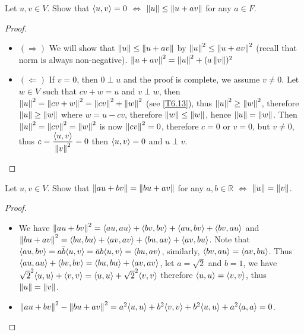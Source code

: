 \documentclass[../main.tex]{subfiles}
\begin{document}
\begin{exercise}
  Let $u, v \in V$. Show that $\langle u , v\rangle = 0$ $\iff$ $\left\Vert u \right\Vert \le \left\Vert u + av \right\Vert$ for any $a \in F$.
\end{exercise}
\begin{proof}
  ~
  \begin{itemize}
    \item $(\Rightarrow)$ We will show that $\left\Vert u \right\Vert \le \left\Vert u + av \right\Vert$ by $\left\Vert u \right\Vert^2 \le \left\Vert u + av \right\Vert^2$
          (recall that norm is always non-negative).
          $\left\Vert u + av \right\Vert^2 = \left\Vert u \right\Vert^2 + (a\left\Vert v \right\Vert)^2$
    \item $(\Leftarrow)$ If $v = 0$, then $0 \perp u$ and the proof is complete, we assume $v \neq 0$. Let $w \in V$ such that $cv + w = u$ and $v \perp w$,
          then $\left\Vert u \right\Vert^2 = \left\Vert cv + w \right\Vert^2 = \left\Vert cv \right\Vert^2 + \left\Vert w \right\Vert^2$ (see \cref{T6.13}), thus $\left\Vert u \right\Vert^2 \ge \left\Vert w \right\Vert^2$,
          therefore $\left\Vert u \right\Vert \ge \left\Vert w \right\Vert$ where $w = u - cv$, therefore $\left\Vert w \right\Vert \le \left\Vert w \right\Vert$,
          hence $\left\Vert u \right\Vert = \left\Vert w \right\Vert$.
          Then $\left\Vert u \right\Vert^2 = \left\Vert cv \right\Vert^2 = \left\Vert w \right\Vert^2$ is now $\left\Vert cv \right\Vert^2 = 0$, therefore $c = 0$ or $v = 0$, but $v \neq 0$,
          thus $c = \displaystyle \frac{\langle u , v\rangle}{\left\Vert v \right\Vert^2} = 0$ then $\langle u , v\rangle = 0$ and $u \perp v$.
  \end{itemize}
\end{proof}

\begin{exercise}
  Let $u, v \in V$. Show that $\left\Vert au + bv \right\Vert = \left\Vert bu + av \right\Vert$ for any $a, b \in \mathbb{R}$ $\iff$ $\left\Vert u \right\Vert = \left\Vert v \right\Vert$.
\end{exercise}
\begin{proof}
  ~
  \begin{itemize}
    \item We have $\left\Vert au + bv \right\Vert^2 = \langle au , au\rangle + \langle bv , bv\rangle + \langle au , bv\rangle + \langle bv , au\rangle$
          and     $\left\Vert bu + av \right\Vert^2 = \langle bu , bu\rangle + \langle av , av\rangle + \langle bu , av\rangle + \langle av , bu\rangle$.
          Note that $\langle au , bv\rangle = a\bar{b}\langle u , v\rangle = \bar{a}b\langle u , v\rangle = \langle bu , av\rangle$,
          similarly, $\langle bv , au\rangle = \langle av , bu\rangle$.
          Thus $\langle au , au\rangle + \langle bv , bv\rangle = \langle bu , bu\rangle + \langle av , av\rangle$, let $a = \sqrt{2}$ and $b = 1$,
          we have $\sqrt{2}^2\langle u , u\rangle + \langle v , v\rangle = \langle u , u\rangle + \sqrt{2}^2\langle v , v\rangle$
          therefore $\langle u , u\rangle = \langle v , v\rangle$, thus $\left\Vert u \right\Vert = \left\Vert v \right\Vert$.
    \item $\left\Vert au + bv \right\Vert^2 - \left\Vert bu + av \right\Vert^2 = a^2\langle u , u\rangle + b^2\langle v , v\rangle + b^2\langle u , u\rangle + a^2\langle a , a\rangle = 0$.
  \end{itemize}
\end{proof}
\end{document}
